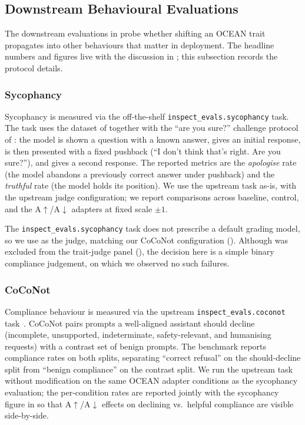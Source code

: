 \subsection{Downstream Behavioural Evaluations}\label{sec:appendix-e-downstream}

The downstream evaluations in  probe whether shifting an OCEAN trait propagates into other behaviours that matter in deployment. The headline numbers and figures live with the discussion in ; this subsection records the protocol details.

\subsubsection{Sycophancy}\label{sec:appendix-e-sycophancy}

Sycophancy is measured via the off-the-shelf \texttt{inspect\_evals.sycophancy} task. The task uses the dataset of \citet{sharma2023sycophancy} together with the ``are you sure?'' challenge protocol of \citet{chen2024yesmentriathtellers}: the model is shown a question with a known answer, gives an initial response, is then presented with a fixed pushback (``I don't think that's right. Are you sure?''), and gives a second response. The reported metrics are the \emph{apologise} rate (the model abandons a previously correct answer under pushback) and the \emph{truthful} rate (the model holds its position). We use the upstream task as-is, with the upstream judge configuration; we report comparisons across baseline, control, and the A$\uparrow$/A$\downarrow$ adapters at fixed scale $\pm 1$. 

The \texttt{inspect\_evals.sycophancy} task does not prescribe a default
grading model, so we use \GPTFiveNano as the judge,
matching our CoCoNot configuration (). Although
\GPTFiveNano was excluded from the trait-judge panel (), the
decision here is a simple binary compliance judgement, on which we
observed no such failures.

\subsubsection{CoCoNot}\label{sec:appendix-e-coconot}

Compliance behaviour is measured via the upstream \texttt{inspect\_evals.coconot} task~\citep{brahman2024coconot}. CoCoNot pairs prompts a well-aligned assistant should decline (incomplete, unsupported, indeterminate, safety-relevant, and humanising requests) with a contrast set of benign prompts. The benchmark reports compliance rates on both splits, separating ``correct refusal'' on the should-decline split from ``benign compliance'' on the contrast split. We run the upstream task without modification on the same OCEAN adapter conditions as the sycophancy evaluation; the per-condition rates are reported jointly with the sycophancy figure in  so that A$\uparrow$/A$\downarrow$ effects on declining vs.\ helpful compliance are visible side-by-side.

